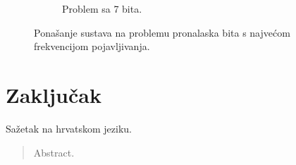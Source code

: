 \documentclass[times, utf8, zavrsni]{fer}
\begin{document}
\begin{figure}
\begin{subfigure}{0.496\textwidth}
        \caption{Problem sa 7 bita.}
        \label{fig:7majre}
    \end{subfigure}
    \caption{Ponašanje sustava na problemu pronalaska bita s najvećom frekvencijom pojavljivanja.}
    \label{fig:states}
\end{figure}

\chapter{Zaključak}





\begin{sazetak}
Sažetak na hrvatskom jeziku.

\end{sazetak}

\begin{abstract}
Abstract.

\end{abstract}
\end{document}
